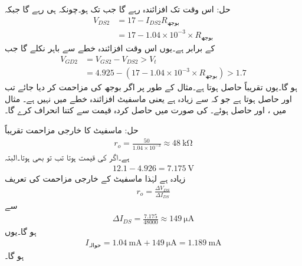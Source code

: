 حل: اس وقت تک افزائندہ رہے گا جب تک  ہو۔چونکہ  ہی رہے گا جبکہ
\begin{align*}
V_{DS2}&=17-I_{DS2} R_{\text{بوجھ} }\\
&=17-1.04 \times 10^{-3} \times R_{\text{بوجھ} }
\end{align*}
کے برابر ہے۔یوں  اس وقت افزائندہ خطے سے باہر نکلے گا جب 
\begin{align*}
V_{GD2}&=V_{GS2}-V_{DS2}> V_t\\
&=4.925-\left(17-1.04 \times 10^{-3} \times R_{\text{بوجھ} } \right) > 1.7
\end{align*} 
ہو گا۔یوں  تقریباً  حاصل ہوتا ہے۔مثال کے طور پر اگر بوجھ کی مزاحمت 
کر دیا جائے تب  اور  حاصل ہوتا ہے جو کہ  سے زیادہ ہے یعنی ماسفیٹ افزائندہ خطے میں نہیں ہے۔
مثال  میں ،  اور  حاصل ہوئے۔  کی صورت میں  حاصل کردہ قیمت سے کتنا انحراف کرے گا۔

حل: ماسفیٹ کا خارجی مزاحمت تقریباً
\begin{align*}
r_o=\frac{50}{1.04 \times 10^{-3}} \approx \SI{48}{\kilo \ohm}
\end{align*} 
ہے۔اگر  کی قیمت  ہوتا تب تو  بھی  ہوتا۔البتہ  
\begin{align*}
12.1-4.926=\SI{7.175}{\volt}
\end{align*}
زیادہ ہے لہٰذا ماسفیٹ کے خارجی مزاحمت کی تعریف
\begin{align*}
r_o=\frac{\Delta V_{DS}}{\Delta I_{DS}}
\end{align*}
سے
\begin{align*}
\Delta I_{DS}=\frac{7.175}{48000} \approx \SI{149}{\micro \ampere}
\end{align*}
ہو گا۔یوں
\begin{align*}
 I_{\text{حوالہ}}=\SI{1.04}{\milli \ampere}+\SI{149}{\micro \ampere}=\SI{1.189}{\milli \ampere}
\end{align*}
ہو گا۔

